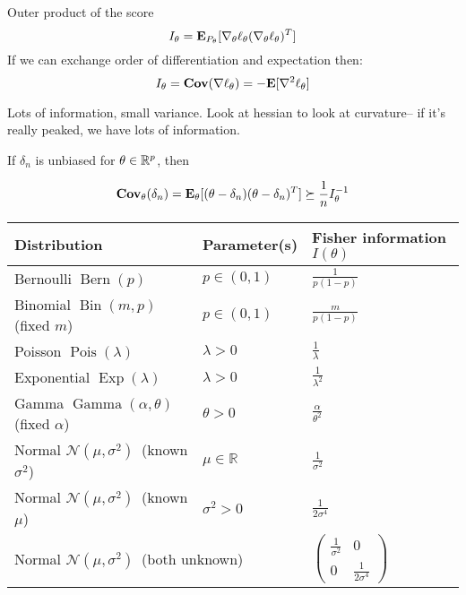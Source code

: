 \documentclass{article}
\begin{document}
\begin{definition}
Outer product of the score
$$I_\theta = \mathbf{E}_{P_\theta} [\nabla_\theta \ell_\theta (\nabla_\theta \ell_\theta)^T]$$
If we can exchange order of differentiation and expectation then:
$$I_\theta = \mathbf{Cov} (\nabla \ell_\theta) = -\mathbf{E}[\nabla^2 \ell_\theta] $$
\end{definition}
Lots of information, small variance. Look at hessian to look at curvature-- if it's really peaked, we have lots of information. 
\begin{theorem}
If $\delta_n$ is unbiased for $\theta\in\mathbb R^p$, then 

$$\mathbf{Cov}_\theta(\delta_n) = \mathbf{E}_\theta[(\theta-\delta_n)(\theta-\delta_n)^T] \succeq \frac{1}{n} I_\theta^{-1}$$
\end{theorem}
\begin{table}[ht]
\centering
\begin{tabular}{|l|l|l|}
\hline
\textbf{Distribution} & \textbf{Parameter(s)} & \textbf{Fisher information $I(\theta)$} \\
\hline
Bernoulli $\operatorname{Bern}(p)$                         & $p\in(0,1)$              & $\displaystyle \frac{1}{p(1-p)}$ \\[4pt]
Binomial $\operatorname{Bin}(m,p)$ \,(fixed $m$)           & $p\in(0,1)$              & $\displaystyle \frac{m}{p(1-p)}$ \\[4pt]
Poisson $\operatorname{Pois}(\lambda)$                     & $\lambda>0$              & $\displaystyle \frac{1}{\lambda}$ \\[6pt]
Exponential $\operatorname{Exp}(\lambda)$                  & $\lambda>0$              & $\displaystyle \frac{1}{\lambda^{2}}$ \\[6pt]
Gamma $\operatorname{Gamma}(\alpha,\theta)$ \,(fixed $\alpha$) & $\theta>0$          & $\displaystyle \frac{\alpha}{\theta^{2}}$ \\[6pt]
Normal $\mathcal N(\mu,\sigma^{2})$ \,(known $\sigma^{2}$) & $\mu\in\mathbb R$        & $\displaystyle \frac{1}{\sigma^{2}}$ \\[8pt]
Normal $\mathcal N(\mu,\sigma^{2})$ \,(known $\mu$)        & $\sigma^{2}>0$           & $\displaystyle \frac{1}{2\sigma^{4}}$ \\[10pt]
\multicolumn{2}{|l|}{Normal $\mathcal N(\mu,\sigma^{2})$ \,(both unknown)}
  & $\displaystyle
    \begin{pmatrix}
      \frac{1}{\sigma^{2}} & 0 \\[6pt]
      0 & \frac{1}{2\sigma^{4}}
    \end{pmatrix}$ \\[10pt]
\hline
\end{tabular}
\end{table}
\end{document}
